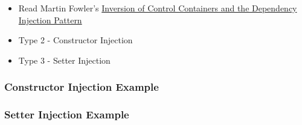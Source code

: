 \begin{itemize}
\itemsep1pt\parskip0pt
\item
  Read Martin Fowler's
  \href{http://www.martinfowler.com/articles/injection.html}{Inversion
  of Control Containers and the Dependency Injection Pattern}
\item
  Type 2 - Constructor Injection
\item
  Type 3 - Setter Injection
\end{itemize}

\subsubsection{Constructor Injection
Example}\label{constructor-injection-example}

\begin{Shaded}
\begin{Highlighting}[]

 
\NormalTok{\};}

 
\NormalTok{:}
  \NormalTok{\{}
  \NormalTok{\}}

\NormalTok{:}
\NormalTok{\};}

 
\NormalTok{\{}
\NormalTok{\}}

\end{Highlighting}
\end{Shaded}

\subsubsection{Setter Injection Example}\label{setter-injection-example}

\begin{Shaded}
\begin{Highlighting}[]

 
\NormalTok{\};}

 
\NormalTok{:}
  \NormalTok{\{}
  \NormalTok{\}}
   

\NormalTok{:}
\NormalTok{\};}

 
\NormalTok{\{}
\NormalTok{\}}

\end{Highlighting}
\end{Shaded}

